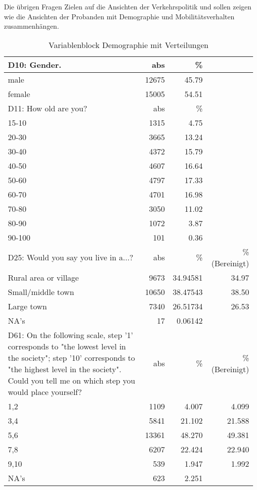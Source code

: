 Die übrigen Fragen Zielen auf die Ansichten der Verkehrspolitik und sollen zeigen wie die Ansichten der Probanden mit Demographie und Mobilitätsverhalten zusammenhängen.

\nocite{schulz}

\begin{table}
	\begin{tabularx}{\textwidth} { b{8cm} | r | r | r}
		D10:  Gender.  & abs   & \%    \\ \hline
		male   & 12675 & 45.79 \\
		female & 15005 & 54.51 \\	\hline
		D11:  How old are you?  & abs   & \%    \\ \hline
		15-10  &  1315 &  4.75 \\
		20-30  &  3665 & 13.24 \\
		30-40  &  4372 & 15.79 \\
		40-50  &  4607 & 16.64 \\
		50-60  &  4797 & 17.33 \\
		60-70  &  4701 & 16.98 \\
		70-80  &  3050 & 11.02 \\
		80-90  &  1072 &  3.87 \\
		90-100 &   101 &  0.36 \\ \hline
		D25: Would you say you live in a...? & abs  & \% & \%(Bereinigt) \\ \hline
		Rural area or village  &    9673 & 34.94581 & 34.97 \\
		Small/middle town      &   10650 & 38.47543 & 38.50 \\
		Large town             &    7340 & 26.51734 & 26.53 \\
		NA's                   &      17 &  0.06142 &       \\ \hline
		D61: On the following scale, step '1' corresponds to "the lowest level in the society"; step '10' corresponds to "the highest level in the society". Could you tell me on which step you would place yourself? & abs  & \% & \%(Bereinigt) \\ \hline
		1,2  & 1109 &  4.007  &       4.099 \\
		3,4  & 5841 &  21.102 &       21.588 \\
		5,6  & 13361&  48.270 &       49.381 \\
		7,8  & 6207 &  22.424 &       22.940 \\
		9,10 & 539  &  1.947  &       1.992 \\
		NA's & 623  &  2.251 \\
	\end{tabularx}
	\caption{Variablenblock Demographie mit Verteilungen}
\end{table}

